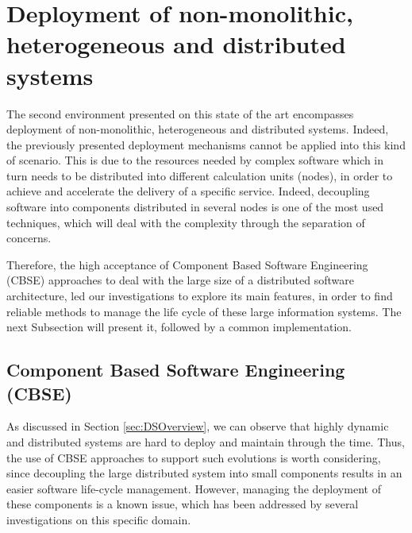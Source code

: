 \section{Deployment of non-monolithic, heterogeneous and distributed systems}
The second environment presented on this state of the art encompasses deployment of non-monolithic, heterogeneous and distributed systems.
Indeed, the previously presented deployment mechanisms cannot be applied into this kind of scenario.
This is due to the resources needed by complex software which in turn needs to be distributed into different calculation units (nodes), in order to achieve and accelerate the delivery of a specific service.
Indeed, decoupling software into components distributed in several nodes is one of the most used techniques, which will deal with the complexity through the separation of concerns.

Therefore, the high acceptance of Component Based Software Engineering (CBSE) approaches \cite{crnkovic2002building} to deal with the large size of a distributed software architecture, led our investigations to explore its main features, in order to find reliable methods to manage the life cycle of these large information systems.
The next Subsection will present it, followed by a common implementation.

\subsection{Component Based Software Engineering (CBSE)}
\label{sec:CBSE}
As discussed in Section \ref{sec:DSOverview}, we can observe that highly dynamic and distributed systems are hard to deploy and maintain through the time.
Thus, the use of CBSE approaches to support such evolutions is worth considering, since decoupling the large distributed system into small components results in an easier software life-cycle management.
However, managing the deployment of these components is a known issue, which has been addressed by several investigations on this specific domain.

